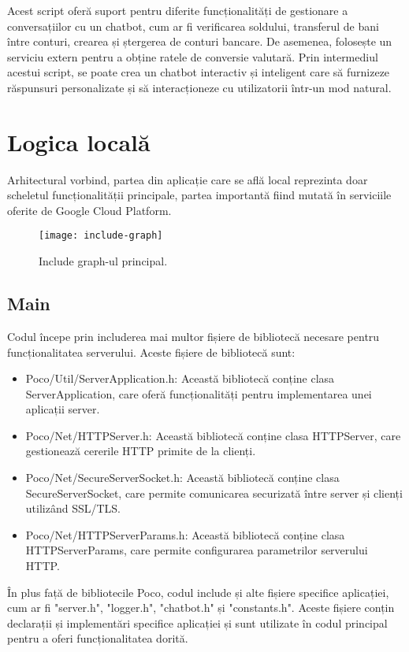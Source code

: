 Acest script oferă suport pentru diferite funcționalități de gestionare a conversațiilor cu un chatbot, cum ar fi verificarea soldului, transferul de bani între conturi, crearea și ștergerea de conturi bancare. De asemenea, folosește un serviciu extern pentru a obține ratele de conversie valutară. Prin intermediul acestui script, se poate crea un chatbot interactiv și inteligent care să furnizeze răspunsuri personalizate și să interacționeze cu utilizatorii într-un mod natural.

\section{Logica locală}

Arhitectural vorbind, partea din aplicație care se află local reprezinta doar scheletul funcționalității principale, partea importantă fiind mutată în serviciile oferite de Google Cloud Platform.

\begin{figure}[h]
  \centering
  \texttt{[image: include-graph]}
  \caption{Include graph-ul principal.}
  \label{fig:includeGraph}
\end{figure}

\subsection{Main}

Codul începe prin includerea mai multor fișiere de bibliotecă necesare pentru funcționalitatea serverului. Aceste fișiere de bibliotecă sunt:

\begin{itemize}
  \item Poco/Util/ServerApplication.h: Această bibliotecă conține clasa ServerApplication, care oferă funcționalități pentru implementarea unei aplicații server.
  \item Poco/Net/HTTPServer.h: Această bibliotecă conține clasa HTTPServer, care gestionează cererile HTTP primite de la clienți.
  \item Poco/Net/SecureServerSocket.h: Această bibliotecă conține clasa SecureServerSocket, care permite comunicarea securizată între server și clienți utilizând SSL/TLS.
  \item Poco/Net/HTTPServerParams.h: Această bibliotecă conține clasa HTTPServerParams, care permite configurarea parametrilor serverului HTTP.
\end{itemize}

În plus față de bibliotecile Poco, codul include și alte fișiere specifice aplicației, cum ar fi "server.h", "logger.h", "chatbot.h" și "constants.h". Aceste fișiere conțin declarații și implementări specifice aplicației și sunt utilizate în codul principal pentru a oferi funcționalitatea dorită.

